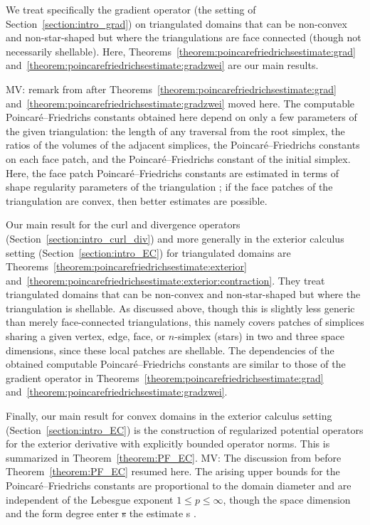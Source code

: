\documentclass[10pt,a4paper]{article}
\newcommand\cye[1]{%
\protect\leavevmode
\begingroup
    \color{blue}%
    #1%
\endgroup
}
\newcommand{\mwl}[1]{{\color{red}#1}}
\begin{document}

\cye{We treat specifically the gradient operator (the setting of Section~\ref{section:intro_grad}) on triangulated domains that can be non-convex and non-star-shaped but where the triangulations are face connected (though not necessarily shellable). Here, Theorems~\ref{theorem:poincarefriedrichsestimate:grad} and~\ref{theorem:poincarefriedrichsestimate:gradzwei} are our main results.} 
\mwl{MV: remark from after Theorems~\ref{theorem:poincarefriedrichsestimate:grad} and~\ref{theorem:poincarefriedrichsestimate:gradzwei} moved here.} 
The computable Poincar\'e--Friedrichs constants obtained here depend on only a few parameters of the \cye{given} triangulation: the length of any traversal from the root simplex, the ratios of the volumes of \cye{the} adjacent simplices, the Poincar\'e--Friedrichs constants on each face patch, and the Poincar\'e--Friedrichs constant of the initial simplex. \cye{Here,} the \cye{face patch} Poincar\'e--Friedrichs constants \cye{are} estimated in terms of shape \cye{regularity parameters of the triangulation}; if the face patches of the triangulation are convex, then better estimates are possible. 

\cye{Our main result for the curl and divergence operators (Section~\ref{section:intro_curl_div}) and more generally in the exterior calculus setting (Section~\ref{section:intro_EC}) for triangulated domains are Theorems~\ref{theorem:poincarefriedrichsestimate:exterior} and~\ref{theorem:poincarefriedrichsestimate:exterior:contraction}.
They treat triangulated domains that can be non-convex and non-star-shaped but where the triangulation is shellable. As discussed above, though this is slightly less generic than merely face-connected triangulations, this namely covers patches of simplices sharing a given vertex, edge, face, or $n$-simplex (stars) in two and three space dimensions, since these local patches are shellable. The dependencies of the obtained computable Poincar\'e--Friedrichs constants are similar to those of the gradient operator in Theorems~\ref{theorem:poincarefriedrichsestimate:grad} and~\ref{theorem:poincarefriedrichsestimate:gradzwei}.}

\cye{Finally, our main result for convex domains in the exterior calculus setting (Section~\ref{section:intro_EC}) is the construction} of regularized potential operators for the exterior derivative with explicitly bounded operator norms. \cye{This is summarized in Theorem~\ref{theorem:PF_EC}.} \mwl{MV: The discussion from before Theorem~\ref{theorem:PF_EC} resumed here.} \cye{The arising upper bounds for} the Poincar\'e--Friedrichs constants are proportional to the domain diameter and are independent of the Lebesgue exponent $1 \leq p \leq \infty$, though the \cye{space} dimension and the form degree enter\cye{\sout{s}} the estimate\cye{s}. 
\end{document}
